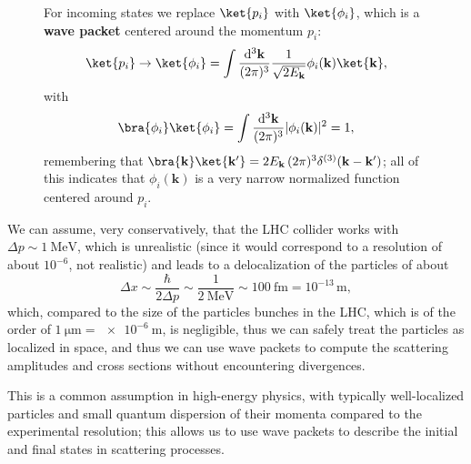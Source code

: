 \begin{figure}[H]
    \begin{minipage}{0.6\textwidth}
        For incoming states we replace \(\ket{p_i}\) with \(\ket{\phi_i}\), which is a \textbf{wave packet} centered around the momentum \(p_i\):
        \[
            \ket{p_i} \to \ket{\phi_i} = \int \frac{\mathrm{d}^3 \mathbf{k}}{(2 \pi)^3} \frac{1}{\sqrt{2 E_{\mathbf{k}}}} \phi_i (\mathbf{k})\ket{\mathbf{k}},
        \]
        with
        \[
            \bra{\phi_i} \ket{\phi_i} = \int \frac{\mathrm{d}^3 \mathbf{k}}{(2 \pi)^3} |\phi_i (\mathbf{k})|^2 = 1,
        \]
        remembering that \(\bra{\mathbf{k}}\ket{\mathbf{k}'} = 2 E_{\mathbf{k}} \, (2 \pi)^3 \delta^{(3)}(\mathbf{k} - \mathbf{k}')\); all of this indicates that \(\phi_i (\mathbf{k})\) is a very narrow normalized function centered around \(p_i\).
    \end{minipage}
    \hfill
    \begin{minipage}{0.35\textwidth}
        \centering
    \end{minipage}

\end{figure}

\begin{example}
    We can assume, very conservatively, that the LHC collider works with \(\Delta p \sim \SI{1}{\mega\electronvolt}\), which is unrealistic (since it would correspond to a resolution of about \(10^{-6}\), not realistic) and leads to a delocalization of the particles of about
    \[
        \Delta x \sim \frac{\hbar}{2 \Delta p} \sim \frac{1}{\SI{2}{\mega\electronvolt}} \sim \SI{100}{\femto\meter} = 10^{-13} \, \mathrm{m},
    \]
    which, compared to the size of the particles bunches in the LHC, which is of the order of \(\SI{1}{\micro\meter} = \SI{e-6}{\meter}\), is negligible, thus we can safely treat the particles as localized in space, and thus we can use wave packets to compute the scattering amplitudes and cross sections without encountering divergences.

    This is a common assumption in high-energy physics, with typically well-localized particles and small quantum dispersion of their momenta compared to the experimental resolution; this allows us to use wave packets to describe the initial and final states in scattering processes.
\end{example}


